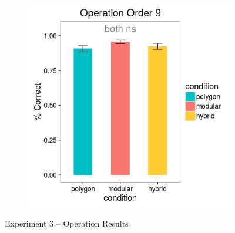 \documentclass[11pt]{article}
\begin{document}
\begin{figure}[H]
\begin{subfigure}[c]{0.4\textwidth}
\includegraphics[width=\textwidth]{figures/3/op_9_r.png}
\end{subfigure}
\caption{Experiment 3 -- Operation Results}
\label{ex3_op}
\end{figure} 
\end{document}
